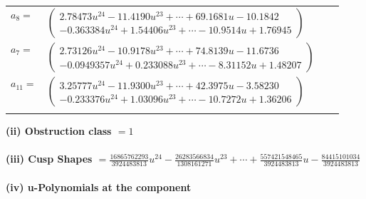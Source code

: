 \documentclass[1p]{elsarticle_modified}
\theoremstyle{definition}
\begin{document}
\begin{tabular}{m{7pt} m{180pt} m{7pt} m{180pt} }
\flushright $a_{8}=$&$\begin{pmatrix}2.78473 u^{24}-11.4190 u^{23}+\cdots+69.1681 u-10.1842\\-0.363384 u^{24}+1.54406 u^{23}+\cdots-10.9514 u+1.76945\end{pmatrix}$ \\
\flushright $a_{7}=$&$\begin{pmatrix}2.73126 u^{24}-10.9178 u^{23}+\cdots+74.8139 u-11.6736\\-0.0949357 u^{24}+0.233088 u^{23}+\cdots-8.31152 u+1.48207\end{pmatrix}$ \\
\flushright $a_{11}=$&$\begin{pmatrix}3.25777 u^{24}-11.9300 u^{23}+\cdots+42.3975 u-3.58230\\-0.233376 u^{24}+1.03096 u^{23}+\cdots-10.7272 u+1.36206\end{pmatrix}$\\&\end{tabular}
\flushleft \textbf{(ii) Obstruction class $= 1$}\\~\\
\flushleft \textbf{(iii) Cusp Shapes $= \frac{16865762293}{3924483813} u^{24}-\frac{26283566834}{1308161271} u^{23}+\cdots+\frac{557421548465}{3924483813} u-\frac{84415101034}{3924483813}$}\\~\\
\newpage\renewcommand{\arraystretch}{1}
\flushleft \textbf{(iv) u-Polynomials at the component}\newline \\
\end{document}

